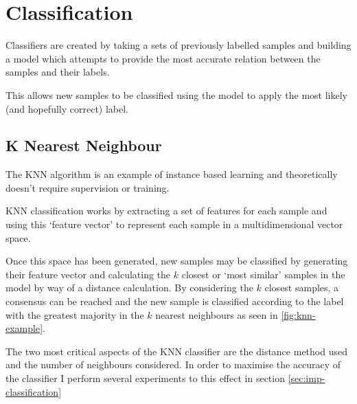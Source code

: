 \section{Classification}

Classifiers are created by taking a sets of previously labelled samples and building a model which attempts to provide the most accurate relation between the samples and their labels.

This allows new samples to be classified using the model to apply the most likely (and hopefully correct) label.

\subsection{K Nearest Neighbour}

The \acrfull{KNN} algorithm is an example of instance based learning and theoretically doesn't require supervision or training.

KNN classification works by extracting a set of features for each sample and using this `feature vector' to represent each sample in a multidimensional vector space.

Once this space has been generated, new samples may be classified by generating their feature vector and calculating the $k$ closest or `most similar' samples in the model by way of a distance calculation. By considering the $k$ closest samples, a consensus can be reached and the new sample is classified according to the label with the greatest majority in the $k$ nearest neighbours as seen in \ref{fig:knn-example}.

The two most critical aspects of the KNN classifier are the distance method used and the number of neighbours considered. In order to maximise the accuracy of the classifier I perform several experiments to this effect in section \ref{sec:imp-classification}
